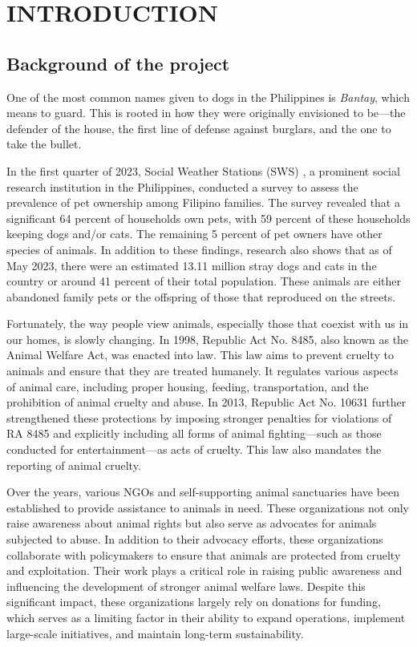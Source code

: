 \section{INTRODUCTION}
    \subsection{Background of the project}

            One of the most common names given to dogs in the Philippines is \textit{Bantay}, which means to guard\citep{Bantay}. This is rooted in how they were originally envisioned to be—the defender of the house, the first line of defense against burglars, and the one to take the bullet.

            In the first quarter of 2023, Social Weather Stations (SWS) , a prominent social research institution in the Philippines, conducted a survey to assess the prevalence of pet ownership among Filipino families. The survey revealed that a significant 64 percent of households own pets, with 59 percent of these households keeping dogs and/or cats. The remaining 5 percent of pet owners have other species of animals\citep{SwsHouseholdPet2023}. In addition to these findings, research also shows that as of May 2023, there were an estimated 13.11 million stray dogs and cats in the country or around 41 percent of their total population\citep{Overpopulation2024}. These animals are either abandoned family pets or the offspring of those that reproduced on the streets.
            
            Fortunately, the way people view animals, especially those that coexist with us in our homes, is slowly changing. In 1998, Republic Act No. 8485, also known as the Animal Welfare Act, was enacted into law\citep{RA8485}. This law aims to prevent cruelty to animals and ensure that they are treated humanely. It regulates various aspects of animal care, including proper housing, feeding, transportation, and the prohibition of animal cruelty and abuse. In 2013, Republic Act No. 10631 further strengthened these protections by imposing stronger penalties for violations of RA 8485 and explicitly including all forms of animal fighting—such as those conducted for entertainment—as acts of cruelty. This law also mandates the reporting of animal cruelty\citep{RA10631}.

            Over the years, various NGOs and self-supporting animal sanctuaries have been established to provide assistance to animals in need. These organizations not only raise awareness about animal rights but also serve as advocates for animals subjected to abuse\citep{KilluaNews}. In addition to their advocacy efforts, these organizations collaborate with policymakers to ensure that animals are protected from cruelty and exploitation. Their work plays a critical role in raising public awareness and influencing the development of stronger animal welfare laws. Despite this significant impact, these organizations largely rely on donations for funding, which serves as a limiting factor in their ability to expand operations, implement large-scale initiatives, and maintain long-term sustainability.
            
